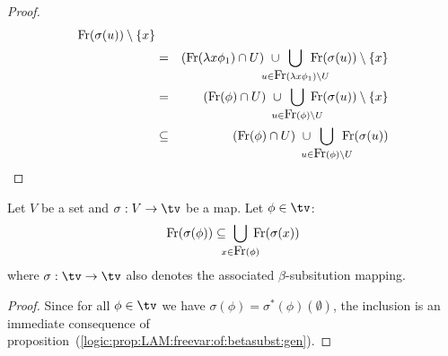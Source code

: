 \begin{proof}
\begin{eqnarray*}
            \free(\sigma(u))\setminus\{x\}\\
        &=&(\free(\lambda x\phi_{1})\cap U)
            \ \cup 
            \!\!\!\!\!\!\!\!\!\!
            \bigcup_{u\in\free(\lambda x\phi_{1})\setminus U}
            \!\!\!\!\!\!\!\!\!\!
            \free(\sigma(u))\setminus\{x\}\\
        &=&(\free(\phi)\cap U)
            \ \cup\ 
            \!\!\!\!\!\!\!\!
            \bigcup_{u\in\free(\phi)\setminus U} 
            \!\!\!\!\!\!\!
            \free(\sigma(u))\setminus\{x\}\\
        &\subseteq&(\free(\phi)\cap U)
            \ \cup\ 
            \!\!\!\!\!\!\!\!
            \bigcup_{u\in\free(\phi)\setminus U}
            \!\!\!\!\!\!
            \free(\sigma(u))
    \end{eqnarray*}
\end{proof}

\begin{prop}\label{logic:prop:LAM:freevar:of:betasubst:inclusion}
Let $V$ be a set and $\sigma:V\to\tv$ be a map. Let $\phi\in\tv$:
    \[
    \free(\sigma(\phi))\subseteq
    \!\!\!\!\bigcup_{x\in\free(\phi)}\!\!\!\!
    \free(\sigma(x))
    \]
where $\sigma:\tv\to\tv$ also denotes the associated $\beta$-subsitution mapping.
\end{prop}
\begin{proof}
Since for all $\phi\in\tv$ we have $\sigma(\phi)=\sigma^{*}(\phi)(\emptyset)$, 
the inclusion is an immediate consequence of 
proposition~(\ref{logic:prop:LAM:freevar:of:betasubst:gen}).
\end{proof}

